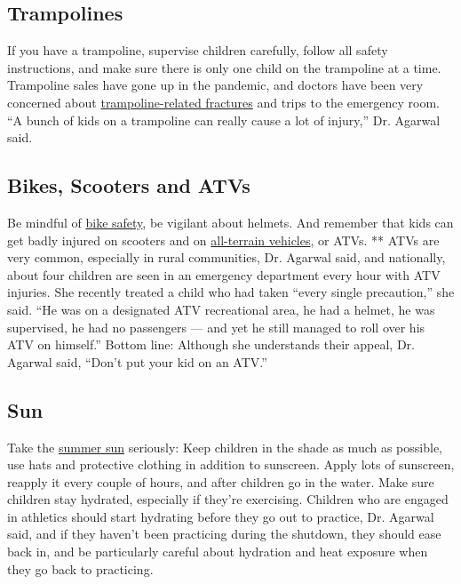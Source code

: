 \hypertarget{trampolines}{%
\subsection{Trampolines}\label{trampolines}}

If you have a trampoline, supervise children carefully, follow all
safety instructions, and make sure there is only one child on the
trampoline at a time. Trampoline sales have gone up in the pandemic, and
doctors have been very concerned about
\href{https://www.nytimes.com/2020/06/19/well/family/coronavirus-shutdown-children-injuries.html?searchResultPosition=1}{trampoline-related
fractures} and trips to the emergency room. ``A bunch of kids on a
trampoline can really cause a lot of injury,'' Dr. Agarwal said.

\hypertarget{bikes-scooters-and-atvs}{%
\subsection{Bikes, Scooters and ATVs}\label{bikes-scooters-and-atvs}}

Be mindful of
\href{https://www.nytimes.com/2019/06/10/well/family/children-bike-scooter-safety.html?searchResultPosition=3}{bike
safety}, be vigilant about helmets. And remember that kids can get badly
injured on scooters and on
\href{https://www.healthychildren.org/English/safety-prevention/at-play/Pages/ATV-Safety-Rules.aspx}{all-terrain
vehicles}, or ATVs. ** ATVs are very common, especially in rural
communities, Dr. Agarwal said, and nationally, about four children are
seen in an emergency department every hour with ATV injuries. She
recently treated a child who had taken ``every single precaution,'' she
said. ``He was on a designated ATV recreational area, he had a helmet,
he was supervised, he had no passengers --- and yet he still managed to
roll over his ATV on himself.'' Bottom line: Although she understands
their appeal, Dr. Agarwal said, ``Don't put your kid on an ATV.''

\hypertarget{sun}{%
\subsection{Sun}\label{sun}}

Take the
\href{https://www.nytimes.com/2019/07/15/well/family/shielding-kids-from-the-sun-isnt-just-about-sunscreen.html?searchResultPosition=2}{summer
sun} seriously: Keep children in the shade as much as possible, use hats
and protective clothing in addition to sunscreen. Apply lots of
sunscreen, reapply it every couple of hours, and after children go in
the water. Make sure children stay hydrated, especially if they're
exercising. Children who are engaged in athletics should start hydrating
before they go out to practice, Dr. Agarwal said, and if they haven't
been practicing during the shutdown, they should ease back in, and be
particularly careful about hydration and heat exposure when they go back
to practicing.

